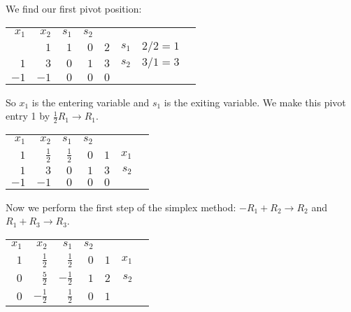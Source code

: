\documentclass[11pt,letterpaper]{article}
\begin{document}
We find our first pivot position: 

	\begin{table}[!ht]
	\centering
	\begin{tabular}{rrrrrrr r}
	{\small $x_1$} & {\small $x_2$} & {\small $s_1$} & {\small $s_2$} \\
	\fbox{$2$} & $1$ & $1$ & \multicolumn{1}{r|}{$0$} & $2$ & {\small $s_1$} & {\small $2/2= 1$} \\
	$1$ & $3$ & $0$ & \multicolumn{1}{r|}{$1$} & $3$ & {\small $s_2$} &  {\small $3/1= 3$} \\ \cline{1-5}
	\underline{$-1$} & $-1$ & $0$ & \multicolumn{1}{r|}{$0$} & $0$ 
	\end{tabular}
	\end{table}

So $x_1$ is the entering variable and $s_1$ is the exiting variable. We make this pivot entry 1 by $\frac{1}{2}R_1 \to R_1$. \newpage

	\begin{table}[!ht]
	\centering
	\begin{tabular}{rrrrrrr}
	{\small $x_1$} & {\small $x_2$} & {\small $s_1$} & {\small $s_2$} \\
	$1$ & $\frac{1}{2}$ & $\frac{1}{2}$ & \multicolumn{1}{r|}{$0$} & $1$ & {\small $x_1$} \\
	$1$ & $3$ & $0$ & \multicolumn{1}{r|}{$1$} & $3$ & {\small $s_2$} \\ \cline{1-5}
	$-1$ & $-1$ & $0$ & \multicolumn{1}{r|}{$0$} & $0$ 
	\end{tabular}
	\end{table} \par

Now we perform the first step of the simplex method: $-R_1 + R_2 \to R_2$ and $R_1 + R_3 \to R_3$. 

	\begin{table}[!ht]
	\centering
	\begin{tabular}{rrrrrrr}
	{\small $x_1$} & {\small $x_2$} & {\small $s_1$} & {\small $s_2$} \\
	$1$ & $\frac{1}{2}$ & $\frac{1}{2}$ & \multicolumn{1}{r|}{$0$} & $1$ & {\small $x_1$} \\
	$0$ & $\frac{5}{2}$ & $-\frac{1}{2}$ & \multicolumn{1}{r|}{$1$} & $2$ & {\small $s_2$} \\ \cline{1-5}
	$0$ & $-\frac{1}{2}$ & $\frac{1}{2}$ & \multicolumn{1}{r|}{$0$} & $1$ 
	\end{tabular}
	\end{table}
\end{document}
